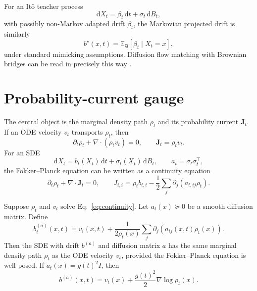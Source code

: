\documentclass[twoside,11pt]{jmlr}
\numberwithin{equation}{section}
\newcommand{\E}{\mathbb{E}}
\newcommand{\dd}{\mathrm{d}}
\newcommand{\scrQ}{\mathsf{Q}}
\newcommand{\J}{\bm J}
\begin{document}
For an It\^o teacher process
\begin{equation}
    \dd X_t=\beta_t\,\dd t+\sigma_t\,\dd B_t,
\end{equation}
with possibly non-Markov adapted drift $\beta_t$, the Markovian projected drift is similarly
\begin{equation}
    b^\star(x,t)=\E_{\scrQ}[\beta_t\mid X_t=x],
    \label{eq:markov_projection_drift}
\end{equation}
under standard mimicking assumptions. Diffusion flow matching with Brownian bridges can be read in precisely this way \citep{silveri2024dfm}.

\section{Probability-current gauge}
\label{sec:gauge}

The central object is the marginal density path $\rho_t$ and its probability current $\J_t$. If an ODE velocity $v_t$ transports $\rho_t$, then
\begin{equation}
    \partial_t\rho_t+\nabla\cdot(\rho_t v_t)=0,
    \qquad \J_t=\rho_t v_t.
    \label{eq:continuity}
\end{equation}
For an SDE
\begin{equation}
    \dd X_t=b_t(X_t)\,\dd t+\sigma_t(X_t)\,\dd B_t,
    \qquad a_t=\sigma_t\sigma_t^\top,
    \label{eq:sde}
\end{equation}
the Fokker--Planck equation can be written as a continuity equation
\begin{equation}
    \partial_t\rho_t+\nabla\cdot \J_t=0,
    \qquad
    J_{t,i}=\rho_t b_{t,i}-\frac12\sum_j\partial_j(a_{t,ij}\rho_t).
    \label{eq:prob_current}
\end{equation}

\begin{theorem}
Suppose $\rho_t$ and $v_t$ solve Eq.~\eqref{eq:continuity}. Let $a_t(x)\succeq 0$ be a smooth diffusion matrix. Define
\begin{equation}
    b_i^{(a)}(x,t)
    =v_i(x,t)+\frac{1}{2\rho_t(x)}\sum_j\partial_j\left(a_{ij}(x,t)\rho_t(x)\right).
    \label{eq:gauge_drift}
\end{equation}
Then the SDE with drift $b^{(a)}$ and diffusion matrix $a$ has the same marginal density path $\rho_t$ as the ODE velocity $v_t$, provided the Fokker--Planck equation is well posed. If $a_t(x)=g(t)^2 I$, then
\begin{equation}
    b^{(a)}(x,t)=v_t(x)+\frac{g(t)^2}{2}\nabla\log\rho_t(x).
    \label{eq:scalar_gauge}
\end{equation}
\end{theorem}
\end{document}
